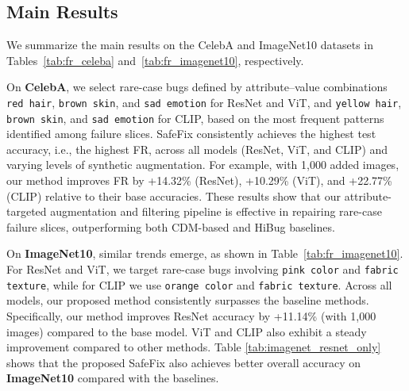\documentclass[10pt]{article} %
\newcommand{\model}{SafeFix\xspace}
\newcommand{\hibug}{HiBug\xspace}
\begin{document}
\subsection{Main Results} 
\label{sec:main_results}




We summarize the main results on the CelebA and ImageNet10 datasets in Tables~\ref{tab:fr_celeba} and~\ref{tab:fr_imagenet10}, respectively.



On \textbf{CelebA}, we select rare-case bugs defined by attribute–value combinations \texttt{red hair}, \texttt{brown skin}, and \texttt{sad emotion} for ResNet and ViT, and \texttt{yellow hair}, \texttt{brown skin}, and \texttt{sad emotion} for CLIP, based on the most frequent patterns identified among failure slices. \model{} consistently achieves the highest test accuracy, i.e., the highest FR, across all models (ResNet, ViT, and CLIP) and varying levels of synthetic augmentation. For example, with 1{,}000 added images, our method improves FR by +14.32\% (ResNet), +10.29\% (ViT), and +22.77\% (CLIP) relative to their base accuracies. These results show that our attribute-targeted augmentation and filtering pipeline is effective in repairing rare-case failure slices, outperforming both CDM-based and \hibug{} baselines.


On \textbf{ImageNet10}, similar trends emerge, as shown in Table~\ref{tab:fr_imagenet10}. For ResNet and ViT, we target rare-case bugs involving \texttt{pink color} and \texttt{fabric texture}, while for CLIP we use \texttt{orange color} and \texttt{fabric texture}. Across all models, our proposed method consistently surpasses the baseline methods. Specifically, our method improves ResNet accuracy by +11.14\% (with 1{,}000 images) compared to the base model. ViT and CLIP also exhibit a steady improvement compared to other methods. Table \ref{tab:imagenet_resnet_only} shows that the proposed SafeFix also achieves better overall accuracy on \textbf{ImageNet10} compared with the baselines.



\end{document}
